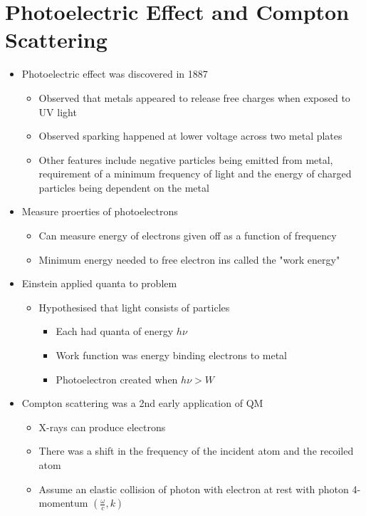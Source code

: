 \documentclass[12pt]{article}
\begin{document}
\section{Photoelectric Effect and Compton Scattering} 
\begin{itemize}
    \item Photoelectric effect was discovered in 1887 \begin{itemize} and was the first evidence for light acting as a particle
        \item Observed that metals appeared to release free charges when exposed to UV light
        \item Observed sparking happened at lower voltage across two metal plates
        \item Other features include negative particles being emitted from metal, requirement of a minimum frequency of light and the energy of charged particles being dependent on the metal
    \end{itemize}
    \item Measure proerties of photoelectrons \begin{itemize}
        \item Can measure energy of electrons given off as a function of frequency 
        \item Minimum energy needed to free electron ins called the "work energy"
    \end{itemize}
    \item Einstein applied quanta to problem \begin{itemize}
        \item Hypothesised that light consists of particles \begin{itemize}
            \item Each had quanta of energy $h \nu$
            \item Work function was energy binding electrons to metal
            \item Photoelectron created when $h \nu > W$
        \end{itemize}
    \end{itemize}
    \item Compton scattering was a 2nd early application of QM \begin{itemize}
        \item X-rays can produce electrons 
        \item There was a shift in the frequency of the incident atom and the recoiled atom
        \item Assume an elastic collision of photon with electron at rest with photon 4-momentum $(\frac{\omega}{c}, k)$

\end{itemize}
\end{itemize}
\end{document}
